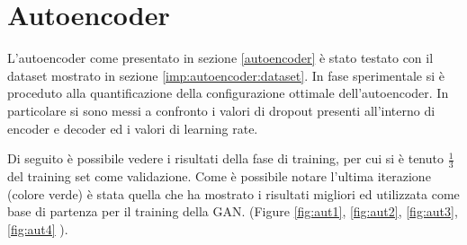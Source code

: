 \section{Autoencoder}
L'autoencoder come presentato in sezione \ref{autoencoder} è stato testato con il dataset mostrato in sezione \ref{imp:autoencoder:dataset}. In fase sperimentale si è proceduto alla quantificazione della configurazione ottimale dell'autoencoder. In particolare si sono messi a confronto i valori di dropout presenti all'interno di encoder e decoder ed i valori di learning rate.

Di seguito è possibile vedere i risultati della fase di training, per cui si è tenuto $\frac{1}{3}$ del training set come validazione. Come è possibile notare l'ultima iterazione (colore verde) è stata quella che ha mostrato i risultati migliori ed utilizzata come base di partenza per il training della GAN. (Figure \ref{fig:aut1}, \ref{fig:aut2}, \ref{fig:aut3}, \ref{fig:aut4} ).

